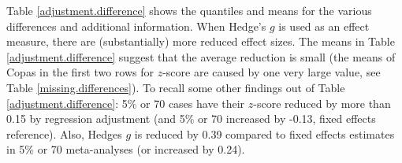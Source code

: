 \documentclass[11pt,a4paper,twoside]{book}\usepackage[]{graphicx}\usepackage[]{color}
\begin{document}
Table \ref{adjustment.difference} shows the quantiles and means for the various differences and additional information. When Hedge's $g$ is used as an effect measure, there are (substantially) more reduced effect sizes. The means in Table \ref{adjustment.difference} suggest that the average reduction is small (the means of Copas in the first two rows for $z$-score are caused by one very large value, see Table \ref{missing.differences}). To recall some other findings out of Table \ref{adjustment.difference}: 5\% or 70 cases have their $z$-score reduced by more than 0.15 by regression adjustment (and 5\% or 70 increased by -0.13, fixed effects reference). Also, Hedges $g$ is reduced by 0.39 compared to fixed effects estimates in 5\% or 70 meta-analyses (or increased by 0.24). 

\end{document}
